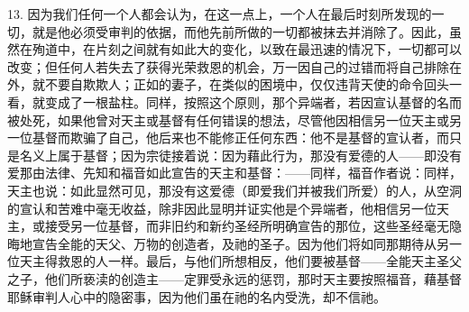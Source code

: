 13. 因为我们任何一个人都会认为，在这一点上，一个人在最后时刻所发现的一切，就是他必须受审判的依据，而他先前所做的一切都被抹去并消除了。因此，虽然在殉道中，在片刻之间就有如此大的变化，以致在最迅速的情况下，一切都可以改变；但任何人若失去了获得光荣救恩的机会，万一因自己的过错而将自己排除在外，就不要自欺欺人；正如的妻子，在类似的困境中，仅仅违背天使的命令回头一看，就变成了一根盐柱。同样，按照这个原则，那个异端者，若因宣认基督的名而被处死，如果他曾对天主或基督有任何错误的想法，尽管他因相信另一位天主或另一位基督而欺骗了自己，他后来也不能修正任何东西：他不是基督的宣认者，而只是名义上属于基督；因为宗徒接着说：因为藉此行为，那没有爱德的人——即没有爱那由法律、先知和福音如此宣告的天主和基督：——同样，福音作者说：同样，天主也说：如此显然可见，那没有这爱德（即爱我们并被我们所爱）的人，从空洞的宣认和苦难中毫无收益，除非因此显明并证实他是个异端者，他相信另一位天主，或接受另一位基督，而非旧约和新约圣经所明确宣告的那位，这些圣经毫无隐晦地宣告全能的天父、万物的创造者，及祂的圣子。因为他们将如同那期待从另一位天主得救恩的人一样。最后，与他们所想相反，他们要被基督——全能天主圣父之子，他们所亵渎的创造主——定罪受永远的惩罚，那时天主要按照福音，藉基督耶稣审判人心中的隐密事，因为他们虽在祂的名内受洗，却不信祂。\par

